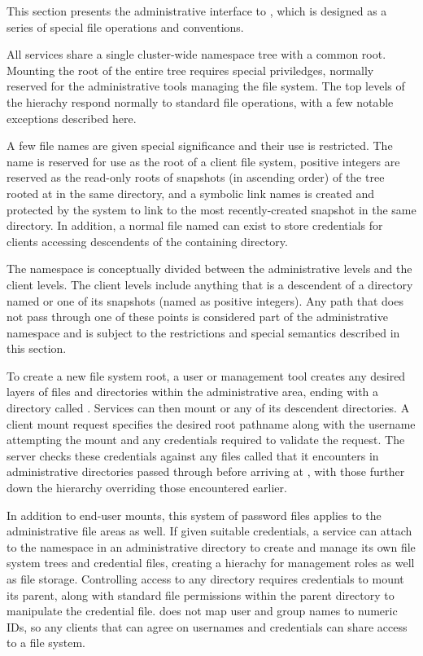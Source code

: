 This section presents the administrative interface to \envoy, which is designed as a series of special file operations and conventions.

All services share a single cluster-wide namespace tree with a common root. Mounting the root of the entire tree requires special priviledges, normally reserved for the administrative tools managing the file system. The top levels of the hierachy respond normally to standard file operations, with a few notable exceptions described here.

A few file names are given special significance and their use is restricted. The name \current is reserved for use as the root of a client file system, positive integers are reserved as the read-only roots of snapshots (in ascending order) of the tree rooted at \current in the same directory, and a symbolic link names \snapshot is created and protected by the system to link to the most recently-created snapshot in the same directory. In addition, a normal file named \password can exist to store credentials for clients accessing descendents of the containing directory.

The namespace is conceptually divided between the administrative levels and the client levels. The client levels include anything that is a descendent of a directory named \current or one of its snapshots (named as positive integers). Any path that does not pass through one of these points is considered part of the administrative namespace and is subject to the restrictions and special semantics described in this section.

To create a new file system root, a user or management tool creates any desired layers of files and directories within the administrative area, ending with a directory called \current. Services can then mount \current or any of its descendent directories. A client mount request specifies the desired root pathname along with the username attempting the mount and any credentials required to validate the request. The server checks these credentials against any files called \password that it encounters in administrative directories passed through before arriving at \current, with those further down the hierarchy overriding those encountered earlier.

In addition to end-user mounts, this system of password files applies to the administrative file areas as well. If given suitable credentials, a service can attach to the namespace in an administrative directory to create and manage its own file system trees and credential files, creating a hierachy for management roles as well as file storage. Controlling access to any directory requires credentials to mount its parent, along with standard file permissions within the parent directory to manipulate the credential file. \envoy does not map user and group names to numeric IDs, so any clients that can agree on usernames and credentials can share access to a file system.

